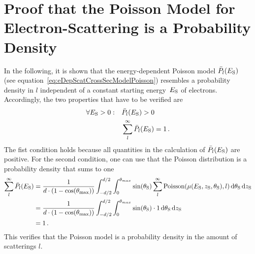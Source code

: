 \section{Proof that the Poisson Model for Electron-Scattering is a Probability Density}
\label{sec:appendixEDepScatCrossSecPoissonModelProbDensityProof}
In the following, it is shown that the energy-dependent Poisson model $\bar{P}_l(E_\mathrm{S})$ (see equation~\ref{eq:eDepScatCrossSecModelPoisson}) resembles a probability density in $l$ independent of a constant starting energy~$E_\mathrm{S}$ of electrons. Accordingly, the two properties that have to be verified are
\begin{align}
\forall E_\mathrm{S} > 0: \quad
&\bar{P}_l(E_\mathrm{S}) > 0 \\
&\sum_{l}^{\infty} \bar{P}_l(E_\mathrm{S}) = 1
\text{\,.}
\end{align}
The fist condition holds because all quantities in the calculation of $\bar{P}_l(E_\mathrm{S})$ are positive. For the second condition, one can use that the Poisson distribution is a probability density that sums to one
\begin{align*}
\sum_{l}^{\infty} \bar{P}_l(E_\mathrm{S}) &=
\frac{1}{d \cdot (1-\cos(\theta_\mathrm{max}))} 
\int_{-d/2}^{d/2}  
\int_{0}^{\theta_{max}} 
\sin(\theta_\mathrm{S})
\sum_{l}^{\infty}
\mathrm{Poisson}(\mu(E_\mathrm{S},z_\mathrm{S},\theta_\mathrm{S}),l)
\mathop{}\!\mathrm{d}\theta_\mathrm{S}
\mathop{}\!\mathrm{d}z_\mathrm{S} \\  &=
\frac{1}{d \cdot (1-\cos(\theta_\mathrm{max}))} 
\int_{-d/2}^{d/2}  
\int_{0}^{\theta_{max}} 
\sin(\theta_\mathrm{S})
\cdot 1
\mathop{}\!\mathrm{d}\theta_\mathrm{S}
\mathop{}\!\mathrm{d}z_\mathrm{S} \\ &= 1
\text{\,.}
\end{align*}
This verifies that the Poisson model is a probability density in the amount of scatterings $l$.
